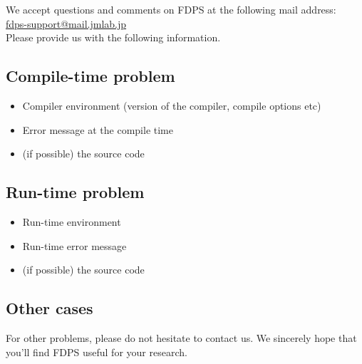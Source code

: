 We accept questions and comments on FDPS at the following mail address: \\
\href{mailto:fdps-support@mail.jmlab.jp}{fdps-support@mail.jmlab.jp} \\
Please provide us with the following information.

\subsection{Compile-time problem}


\begin{itemize}
\item Compiler environment (version of the compiler, compile options etc)
\item Error message at the compile time
\item (if possible) the source code
\end{itemize}

\subsection{Run-time problem}


\begin{itemize}
\item Run-time environment
\item Run-time error message
\item (if possible) the source code
\end{itemize}

\subsection{Other cases}

For other problems, please do not hesitate to contact us.
We sincerely hope that you'll find FDPS useful for your research.

